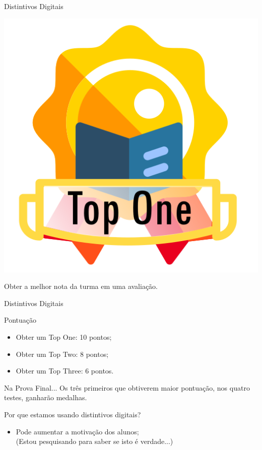 \documentclass[xcolor=dvipsnames,table]{beamer}
\begin{document}
	\begin{frame}{Distintivos Digitais}
		\begin{block}{}
			\begin{center}
				\includegraphics[height=.65\textheight]{images/badges/top-one.png}
			\end{center}		
			Obter a melhor nota da turma em uma avaliação. 
		\end{block}
	\end{frame}
	
	\begin{frame}{Distintivos Digitais}
		\begin{block}{Pontuação}
			\begin{itemize}
				\item Obter um {\sc Top One}: 10 pontos;
				\item Obter um {\sc Top Two}: 8 pontos;
				\item Obter um {\sc Top Three}: 6 pontos.
			\end{itemize}
		\end{block} \pause
		\begin{exampleblock}{Na Prova Final...}
			Os três primeiros que obtiverem maior pontuação, nos quatro testes, ganharão medalhas.
		\end{exampleblock} \pause
		\begin{block}{Por que estamos usando distintivos digitais?}
			\begin{itemize}
				\item Pode aumentar a motivação dos alunos; \\ \pause
				{\color{blue} (Estou pesquisando para saber se isto é verdade...)}
			\end{itemize}
		\end{block}
	\end{frame}
	
\end{document}
